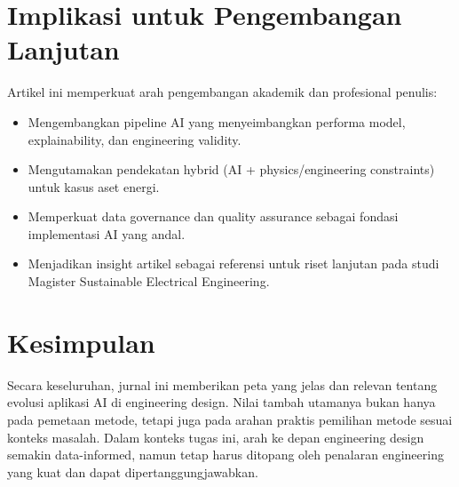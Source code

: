 \documentclass{article}
\begin{document}
\section*{Implikasi untuk Pengembangan Lanjutan}
Artikel ini memperkuat arah pengembangan akademik dan profesional penulis:
\begin{itemize}
    \item Mengembangkan pipeline AI yang menyeimbangkan performa model, explainability, dan engineering validity.
    \item Mengutamakan pendekatan hybrid (AI + physics/engineering constraints) untuk kasus aset energi.
    \item Memperkuat data governance dan quality assurance sebagai fondasi implementasi AI yang andal.
    \item Menjadikan insight artikel sebagai referensi untuk riset lanjutan pada studi Magister Sustainable Electrical Engineering.
\end{itemize}

\section*{Kesimpulan}
Secara keseluruhan, jurnal ini memberikan peta yang jelas dan relevan tentang evolusi aplikasi AI di engineering design. Nilai tambah utamanya bukan hanya pada pemetaan metode, tetapi juga pada arahan praktis pemilihan metode sesuai konteks masalah. Dalam konteks tugas ini, arah ke depan engineering design semakin data-informed, namun tetap harus ditopang oleh penalaran engineering yang kuat dan dapat dipertanggungjawabkan.



\end{document}
